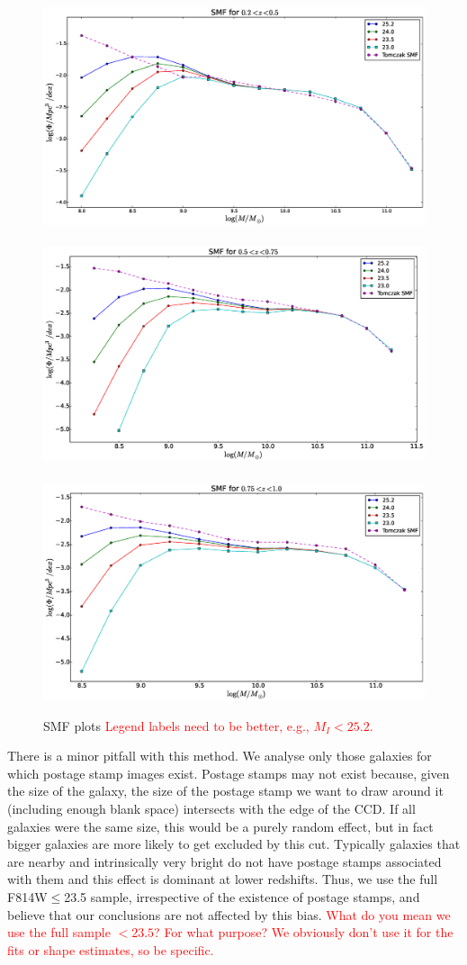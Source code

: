 \documentclass[twocolumn,useAMS,usenatbib]{mn2e}
\newcommand{\rachel}[1]{{\textcolor{red}{#1}}}
\begin{document}
\begin{figure}
 \centering
 \includegraphics[width=0.66\columnwidth]{SMF1} \
 \includegraphics[width=0.66\columnwidth]{SMF2} \
 \includegraphics[width=0.66\columnwidth]{SMF3}
 \caption{SMF plots \rachel{Legend labels need to be better, e.g., $M_I<25.2$.}}
 \label{fig:smf}
\end{figure}

There is a minor pitfall with this method. We analyse only those galaxies for which postage stamp images exist.
Postage stamps may not exist because, given the size of the galaxy,
the size of the postage stamp we want to draw around it (including
enough blank space) intersects with the edge of the CCD.
If all galaxies were the same size, this would be a purely random
effect, but in fact bigger galaxies are more likely to get excluded by
this cut. Typically galaxies that are nearby and intrinsically very bright do not have postage stamps associated with them and this effect is dominant at lower redshifts. 
Thus, we use the full F814W$\le$23.5 sample, irrespective of the
existence of postage stamps, and believe that our conclusions are not
affected by this bias. \rachel{What do you mean we use the full sample
  $<23.5$?  For what purpose?  We obviously don't use it for the fits
  or shape estimates, so be specific.}
\end{document}
